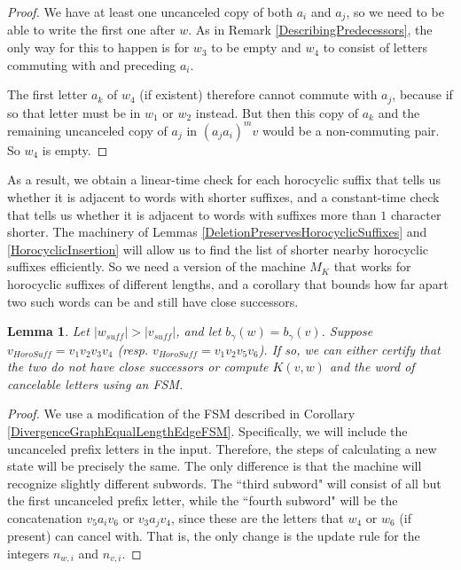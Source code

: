 \documentclass[10pt,a4paper]{amsart}
\newtheorem{lemma}[theorem]{Lemma}
\theoremstyle{definition}
\theoremstyle{remark}
\begin{document}
	\begin{proof}
		
		We have at least one uncanceled copy of both $a_i$ and $a_j$, so we need to be able to write the first one after $w$. As in Remark \ref{DescribingPredecessors}, the only way for this to happen is for $w_3$ to be empty and $w_4$ to consist of letters commuting with and preceding $a_i$.
		
		The first letter $a_k$ of $w_4$ (if existent) therefore cannot commute with $a_j$, because if so that letter must be in $w_1$ or $w_2$ instead. But then this copy of $a_k$ and the remaining uncanceled copy of $a_j$ in $(a_ja_i)^mv$ would be a non-commuting pair. So $w_4$ is empty.
	\end{proof}
	
	As a result, we obtain a linear-time check for each horocyclic suffix that tells us whether it is adjacent to words with shorter suffixes, and a constant-time check that tells us whether it is adjacent to words with suffixes more than $1$ character shorter. The machinery of Lemmas \ref{DeletionPreservesHorocyclicSuffixes} and \ref{HorocyclicInsertion} will allow us to find the list of shorter nearby horocyclic suffixes efficiently. So we need a version of the machine $M_K$ that works for horocyclic suffixes of different lengths, and a corollary that bounds how far apart two such words can be and still have close successors.
	
	\begin{lemma} \label{DivergenceGraphDifferentLengthEdgeFSM}
		Let $|w_{suff}|>|v_{suff}|$, and let $b_\gamma(w)=b_\gamma(v)$. Suppose $v_{HoroSuff}=v_1v_2v_3v_4$ (resp. $v_{HoroSuff}=v_1v_2v_5v_6$). If so, we can either certify that the two do not have close successors or compute $K(v,w)$ and the word of cancelable letters using an FSM.
	\end{lemma}
	
	\begin{proof}
		
		We use a modification of the FSM described in Corollary \ref{DivergenceGraphEqualLengthEdgeFSM}. Specifically, we will include the uncanceled prefix letters in the input. Therefore, the steps of calculating a new state will be precisely the same. The only difference is that the machine will recognize slightly different subwords. The ``third subword" will consist of all but the first uncanceled prefix letter, while the ``fourth subword" will be the concatenation $v_5a_iv_6$ or $v_3a_jv_4$, since these are the letters that $w_4$ or $w_6$ (if present) can cancel with. That is, the only change is the update rule for the integers $n_{w,i}$ and $n_{v, i}$. 
	\end{proof}
	
\end{document}
